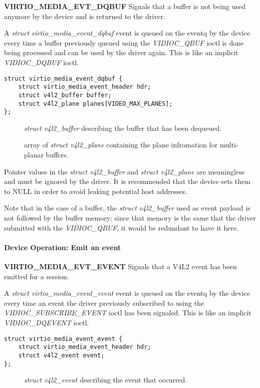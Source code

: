 \textbf{VIRTIO_MEDIA_EVT_DQBUF} Signals that a buffer is not being used anymore
by the device and is returned to the driver.

A \textit{struct virtio_media_event_dqbuf} event is queued on the eventq by the
device every time a buffer previously queued using the \textit{VIDIOC_QBUF}
ioctl is done being processed and can be used by the driver again. This is like
an implicit \textit{VIDIOC_DQBUF} ioctl.

\begin{lstlisting}
struct virtio_media_event_dqbuf {
    struct virtio_media_event_header hdr;
    struct v4l2_buffer buffer;
    struct v4l2_plane planes[VIDEO_MAX_PLANES];
};
\end{lstlisting}

\begin{description}
\item[] \textit{struct v4l2_buffer} describing the buffer that has been dequeued.
\item[] array of \textit{struct v4l2_plane} containing the plane infromation for multi-planar buffers.
\end{description}

Pointer values in the \textit{struct v4l2_buffer} and \textit{struct v4l2_plane}
are meaningless and must be ignored by the driver. It is recommended that the
device sets them to NULL in order to avoid leaking potential host addresses.

Note that in the case of a  buffer, the \textit{struct v4l2_buffer}
used as event payload is not followed by the buffer memory: since that memory
is the same that the driver submitted with the \textit{VIDIOC_QBUF}, it would
be redundant to have it here.

\paragraph{Device Operation: Emit an event}
\label{sec:Device Types / Media Device / Device Operation / Emit an event}

\textbf{VIRTIO_MEDIA_EVT_EVENT} Signals that a V4L2 event has been emitted for a session.

A \textit{struct virtio_media_event_event} event is queued on the eventq by the
device every time an event the driver previously subscribed to using the
\textit{VIDIOC_SUBSCRIBE_EVENT} ioctl has been signaled. This is like an
implicit \textit{VIDIOC_DQEVENT} ioctl.

\begin{lstlisting}
struct virtio_media_event_event {
    struct virtio_media_event_header hdr;
    struct v4l2_event event;
};
\end{lstlisting}

\begin{description}
\item[] \textit{struct v4l2_event} describing the event that occurred.
\end{description}
